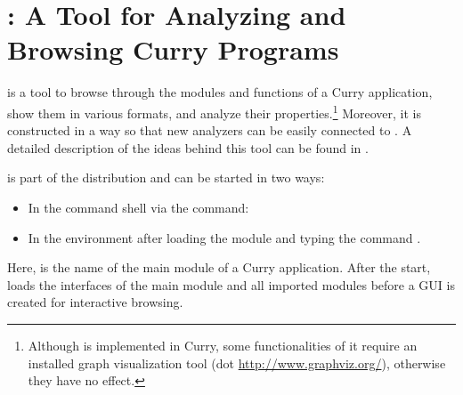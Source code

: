 \section{\cb: A Tool for Analyzing and Browsing Curry Programs}
\label{sec-currybrowser}

\cb is a tool to browse through the modules and functions
of a Curry application, show them in various formats,
and analyze their properties.\footnote{Although \cb is
implemented in Curry, some functionalities of it require an
installed graph visualization tool (dot \url{http://www.graphviz.org/}),
otherwise they have no effect.}
Moreover, it is constructed in a way so that
new analyzers can be easily connected to \cb.
A detailed description of the ideas behind this tool can be
found in \cite{Hanus05WCFLP,Hanus06WLPE}.

\cb is part of the \CYS distribution and can be
started in two ways:
\begin{itemize}
\item
In the command shell via the command: 
\item
In the \CYS environment after loading the module
 and typing the command .
\end{itemize}
Here,  is the name of the main module of a Curry application.
After the start, \cb loads the interfaces of the main
module and all imported modules before a GUI is created
for interactive browsing.

